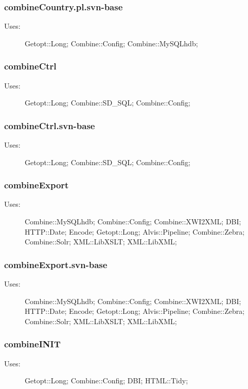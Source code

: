 \subsubsection{combineCountry.pl.svn-base}
\begin{description}
\item[Uses:] Getopt::Long; Combine::Config; Combine::MySQLhdb; 

\end{description}
\subsubsection{combineCtrl}
\begin{description}
\item[Uses:] Getopt::Long; Combine::SD\_SQL; Combine::Config; 

\end{description}
\subsubsection{combineCtrl.svn-base}
\begin{description}
\item[Uses:] Getopt::Long; Combine::SD\_SQL; Combine::Config; 

\end{description}
\subsubsection{combineExport}
\begin{description}
\item[Uses:] Combine::MySQLhdb; Combine::Config; Combine::XWI2XML; DBI; HTTP::Date; Encode; Getopt::Long; Alvis::Pipeline; Combine::Zebra; Combine::Solr; XML::LibXSLT; XML::LibXML; 

\end{description}
\subsubsection{combineExport.svn-base}
\begin{description}
\item[Uses:] Combine::MySQLhdb; Combine::Config; Combine::XWI2XML; DBI; HTTP::Date; Encode; Getopt::Long; Alvis::Pipeline; Combine::Zebra; Combine::Solr; XML::LibXSLT; XML::LibXML; 

\end{description}
\subsubsection{combineINIT}
\begin{description}
\item[Uses:] Getopt::Long; Combine::Config; DBI; HTML::Tidy; 

\end{description}
